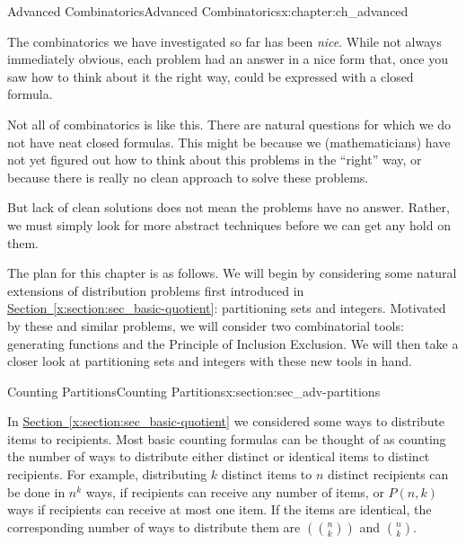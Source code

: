 \documentclass[oneside,10pt,]{book}
\numberwithin{equation}{chapter}
\newcommand{\mchoose}[2]{\left(\!\binom{#1}{#2}\!\right)}
\begin{document}
%
%
\typeout{************************************************}
\typeout{************************************************}
%
\begin{chapterptx}{Advanced Combinatorics}{}{Advanced Combinatorics}{}{}{x:chapter:ch_advanced}
\begin{introduction}{}%
The combinatorics we have investigated so far has been \emph{nice}.  While not always immediately obvious, each problem had an answer in a nice form that, once you saw how to think about it the right way, could be expressed with a closed formula.%
\par
Not all of combinatorics is like this.  There are natural questions for which we do not have neat closed formulas.  This might be because we (mathematicians) have not yet figured out how to think about this problems in the ``right'' way, or because there is really no clean approach to solve these problems.%
\par
But lack of clean solutions does not mean the problems have no answer.  Rather, we must simply look for more abstract techniques before we can get any hold on them.%
\par
The plan for this chapter is as follows.  We will begin by considering some natural extensions of distribution problems first introduced in \hyperref[x:section:sec_basic-quotient]{Section~\ref{x:section:sec_basic-quotient}}: partitioning sets and integers.  Motivated by these and similar problems, we will consider two combinatorial tools: generating functions and the Principle of Inclusion Exclusion.  We will then take a closer look at partitioning sets and integers with these new tools in hand.%
\end{introduction}%
%
%
\typeout{************************************************}
\typeout{************************************************}
%
\begin{sectionptx}{Counting Partitions}{}{Counting Partitions}{}{}{x:section:sec_adv-partitions}
\begin{introduction}{}%
In \hyperref[x:section:sec_basic-quotient]{Section~\ref{x:section:sec_basic-quotient}} we considered some ways to distribute items to recipients.  Most basic counting formulas can be thought of as counting the number of ways to distribute either distinct or identical items to distinct recipients.  For example, distributing \(k\) distinct items to \(n\) distinct recipients can be done in \(n^k\) ways, if recipients can receive any number of items, or \(P(n,k)\) ways if recipients can receive at most one item.  If the items are identical, the corresponding number of ways to distribute them are \(\mchoose{n}{k}\) and \(\binom{n}{k}\).%

\end{introduction}
\end{sectionptx}
\end{chapterptx}
\end{document}
